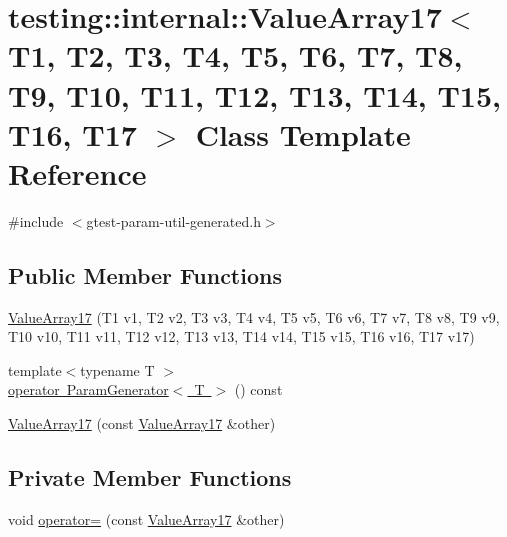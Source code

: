 \hypertarget{classtesting_1_1internal_1_1_value_array17}{}\section{testing\+::internal\+::Value\+Array17$<$ T1, T2, T3, T4, T5, T6, T7, T8, T9, T10, T11, T12, T13, T14, T15, T16, T17 $>$ Class Template Reference}
\label{classtesting_1_1internal_1_1_value_array17}


{\ttfamily \#include $<$gtest-\/param-\/util-\/generated.\+h$>$}

\subsection*{Public Member Functions}
\begin{DoxyCompactItemize}
\item 
\mbox{\hyperlink{classtesting_1_1internal_1_1_value_array17_a943a86a365abde6bdd667e1ad2dbff9b}{Value\+Array17}} (T1 v1, T2 v2, T3 v3, T4 v4, T5 v5, T6 v6, T7 v7, T8 v8, T9 v9, T10 v10, T11 v11, T12 v12, T13 v13, T14 v14, T15 v15, T16 v16, T17 v17)
\item 
{\footnotesize template$<$typename T $>$ }\\\mbox{\hyperlink{classtesting_1_1internal_1_1_value_array17_a31189716b99483febb83ae7436cd3f6f}{operator Param\+Generator$<$ T $>$}} () const
\item 
\mbox{\hyperlink{classtesting_1_1internal_1_1_value_array17_a20233ef4958a1b16ec7a8c004f1604fb}{Value\+Array17}} (const \mbox{\hyperlink{classtesting_1_1internal_1_1_value_array17}{Value\+Array17}} \&other)
\end{DoxyCompactItemize}
\subsection*{Private Member Functions}
\begin{DoxyCompactItemize}
\item 
void \mbox{\hyperlink{classtesting_1_1internal_1_1_value_array17_afb64e40218b53e8cd2e5cc320041e16d}{operator=}} (const \mbox{\hyperlink{classtesting_1_1internal_1_1_value_array17}{Value\+Array17}} \&other)
\end{DoxyCompactItemize}
